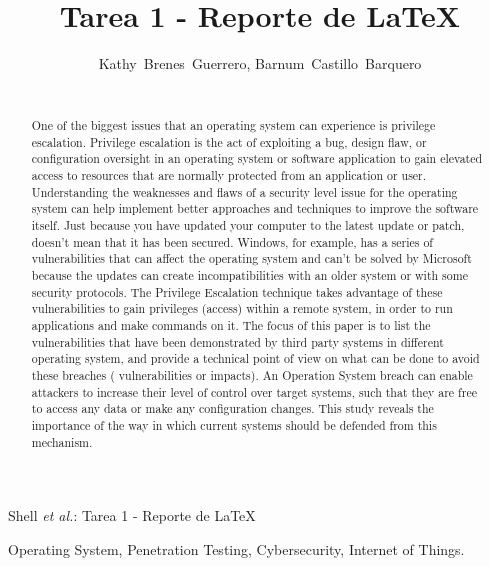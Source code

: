 \documentclass[letterpaper, 10pt, journal]{IEEEtran}
\begin{document}
\title{Tarea 1 - Reporte de \LaTeX  }
\author{Kathy~Brenes~Guerrero, Barnum~Castillo~Barquero

~}%

%
{Shell \MakeLowercase{\textit{et al.}}: Tarea 1 - Reporte de \LaTeX  }
\maketitle

\begin{abstract}
One of the biggest issues that an operating system can experience is privilege escalation. Privilege escalation is the act of exploiting a bug, design flaw, or configuration oversight in an operating system or software application to gain elevated access to resources that are normally protected from an application or user. Understanding the weaknesses and flaws of a security level issue for the operating system can help implement better approaches and techniques to improve the software itself. Just because you have updated your computer to the latest update or patch, doesn’t mean that it has been secured. Windows, for example, has a series of vulnerabilities that can affect the operating system and can't be solved by Microsoft because the updates can create incompatibilities with an older system or with some security protocols. The Privilege Escalation technique takes advantage of these vulnerabilities to  gain privileges (access) within a remote  system, in order to run applications and make commands on it. The focus of this paper is to list the vulnerabilities that have been demonstrated by third party systems in different operating system, and provide a technical point of view  on what can be done to avoid these breaches ( vulnerabilities or impacts). An Operation System breach can enable attackers to increase their level of control over target systems, such that they are free to access any data or make any configuration changes. This study reveals the importance of the way in which current systems should be defended from this mechanism.
\end{abstract}
\begin{IEEEkeywords}
Operating System, Penetration Testing, Cybersecurity, Internet of Things.
\end{IEEEkeywords}
\end{document}
